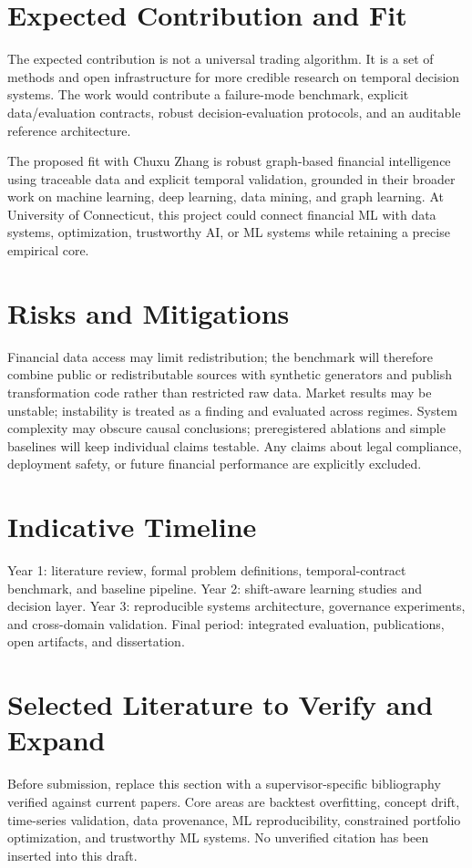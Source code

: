 \documentclass[11pt]{article}
\begin{document}
\section*{Expected Contribution and Fit}
The expected contribution is not a universal trading algorithm. It is a set of methods and open infrastructure for more credible research on temporal decision systems. The work would contribute a failure-mode benchmark, explicit data/evaluation contracts, robust decision-evaluation protocols, and an auditable reference architecture.

The proposed fit with Chuxu Zhang is robust graph-based financial intelligence using traceable data and explicit temporal validation, grounded in their broader work on machine learning, deep learning, data mining, and graph learning. At University of Connecticut, this project could connect financial ML with data systems, optimization, trustworthy AI, or ML systems while retaining a precise empirical core.

\section*{Risks and Mitigations}
Financial data access may limit redistribution; the benchmark will therefore combine public or redistributable sources with synthetic generators and publish transformation code rather than restricted raw data. Market results may be unstable; instability is treated as a finding and evaluated across regimes. System complexity may obscure causal conclusions; preregistered ablations and simple baselines will keep individual claims testable. Any claims about legal compliance, deployment safety, or future financial performance are explicitly excluded.

\section*{Indicative Timeline}
Year 1: literature review, formal problem definitions, temporal-contract benchmark, and baseline pipeline. Year 2: shift-aware learning studies and decision layer. Year 3: reproducible systems architecture, governance experiments, and cross-domain validation. Final period: integrated evaluation, publications, open artifacts, and dissertation.

\section*{Selected Literature to Verify and Expand}
Before submission, replace this section with a supervisor-specific bibliography verified against current papers. Core areas are backtest overfitting, concept drift, time-series validation, data provenance, ML reproducibility, constrained portfolio optimization, and trustworthy ML systems. No unverified citation has been inserted into this draft.
\end{document}
